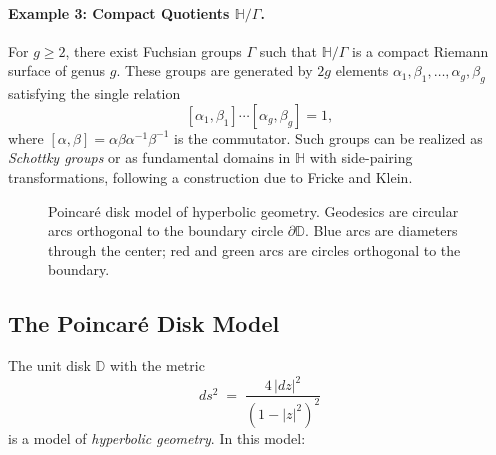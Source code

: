\paragraph{Example 3: Compact Quotients $\mathbb{H}/\Gamma$.}
For $g \geq 2$, there exist Fuchsian groups $\Gamma$ such that $\mathbb{H}/\Gamma$ is a compact Riemann surface of genus $g$. These groups are generated by $2g$ elements $\alpha_1, \beta_1, \ldots, \alpha_g, \beta_g$ satisfying the single relation
\[
    [\alpha_1, \beta_1] \cdots [\alpha_g, \beta_g] = 1,
\]
where $[\alpha, \beta] = \alpha \beta \alpha^{-1} \beta^{-1}$ is the commutator. Such groups can be realized as \emph{Schottky groups} or as fundamental domains in $\mathbb{H}$ with side-pairing transformations, following a construction due to Fricke and Klein.

\begin{figure}[htbp]
\centering
{}
\caption{Poincar\'e disk model of hyperbolic geometry. Geodesics are circular arcs orthogonal to the boundary circle $\partial \mathbb{D}$. Blue arcs are diameters through the center; red and green arcs are circles orthogonal to the boundary.}
\label{fig:poincare-disk}
\end{figure}

\subsection{The Poincar\'e Disk Model}

The unit disk $\mathbb{D}$ with the metric
\[
    ds^2 \;=\; \frac{4\,|dz|^2}{(1 - |z|^2)^2}
\]
is a model of \emph{hyperbolic geometry}. In this model:


